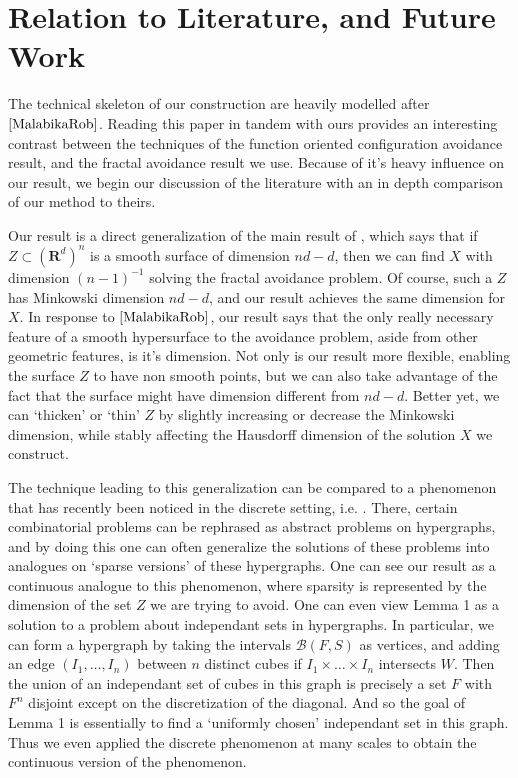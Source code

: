 \documentclass{article}
\theoremstyle{plain}
\theoremstyle{plain}
\begin{document}
\section{Relation to Literature, and Future Work}

The technical skeleton of our construction are heavily modelled after $\cite{MalabikaRob}$. Reading this paper in tandem with ours provides an interesting contrast between the techniques of the function oriented configuration avoidance result, and the fractal avoidance result we use. Because of it's heavy influence on our result, we begin our discussion of the literature with an in depth comparison of our method to theirs.

Our result is a direct generalization of the main result of \cite{MalabikaRob}, which says that if $Z \subset (\mathbf{R}^d)^n$ is a smooth surface of dimension $nd - d$, then we can find $X$ with dimension $(n-1)^{-1}$ solving the fractal avoidance problem. Of course, such a $Z$ has Minkowski dimension $nd - d$, and our result achieves the same dimension for $X$. In response to $\cite{MalabikaRob}$, our result says that the only really necessary feature of a smooth hypersurface to the avoidance problem, aside from other geometric features, is it's dimension. Not only is our result more flexible, enabling the surface $Z$ to have non smooth points, but we can also take advantage of the fact that the surface might have dimension different from $nd - d$. Better yet, we can `thicken' or `thin' $Z$ by slightly increasing or decrease the Minkowski dimension, while stably affecting the Hausdorff dimension of the solution $X$ we construct.

The technique leading to this generalization can be compared to a phenomenon that has recently been noticed in the discrete setting, i.e. \cite{BaloghMorrisSamotij}. There, certain combinatorial problems can be rephrased as abstract problems on hypergraphs, and by doing this one can often generalize the solutions of these problems into analogues on `sparse versions' of these hypergraphs. One can see our result as a continuous analogue to this phenomenon, where sparsity is represented by the dimension of the set $Z$ we are trying to avoid. One can even view Lemma 1 as a solution to a problem about independant sets in hypergraphs. In particular, we can form a hypergraph by taking the intervals $\mathcal{B}(F,S)$ as vertices, and adding an edge $(I_1, \dots, I_n)$ between $n$ distinct cubes if $I_1 \times \dots \times I_n$ intersects $W$. Then the union of an independant set of cubes in this graph is precisely a set $F$ with $F^n$ disjoint except on the discretization of the diagonal. And so the goal of Lemma 1 is essentially to find a `uniformly chosen' independant set in this graph. Thus we even applied the discrete phenomenon at many scales to obtain the continuous version of the phenomenon.
\end{document}

